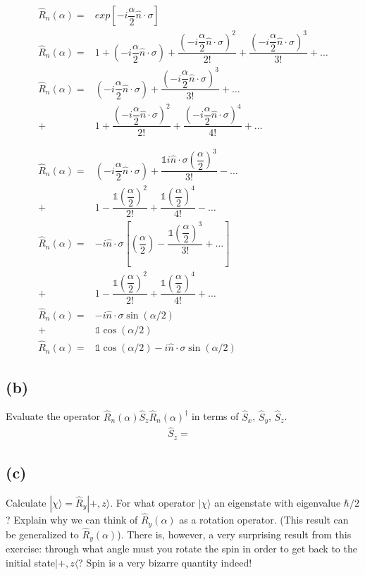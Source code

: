 \documentclass[12pt, a4paper]{article}
\begin{document}
\begin{align*}
\hat{R}_n (\alpha) =& exp\left[-i\dfrac{\alpha}{2}\hat{n}\cdot{\sigma}\right]
\\
\hat{R}_n (\alpha) =& 1 + 
\left(-i\dfrac{\alpha}{2}\hat{n}\cdot{\sigma}\right) + 
\dfrac{\left(-i\dfrac{\alpha}{2}\hat{n}\cdot{\sigma}\right)^2}{2!} +
\dfrac{\left(-i\dfrac{\alpha}{2}\hat{n}\cdot{\sigma}\right)^3}{3!} + \dots
\\
\hat{R}_n (\alpha)=& \left(-i\dfrac{\alpha}{2}\hat{n}\cdot{\sigma}\right) + 
\dfrac{\left(-i\dfrac{\alpha}{2}\hat{n}\cdot{\sigma}\right)^3}{3!} + \dots
\\
+& 1 + \dfrac{\left(-i\dfrac{\alpha}{2}\hat{n}\cdot{\sigma}\right)^2}{2!} +
\dfrac{\left(-i\dfrac{\alpha}{2}\hat{n}\cdot{\sigma}\right)^4}{4!} + \dots
\\
\\
\\
\hat{R}_n (\alpha)=& \left(-i\dfrac{\alpha}{2}\hat{n}\cdot{\sigma}\right) + \dfrac{\mathds{1}i\hat{n}\cdot{\sigma}\left(\dfrac{\alpha}{2}\right)^3}{3!} - \dots 
\\
+& 1 - \dfrac{\mathds{1}\left(\dfrac{\alpha}{2}\right)^2}{2!} + \dfrac{\mathds{1}\left(\dfrac{\alpha}{2}\right)^4}{4!} - \dots 
\\
\hat{R}_n (\alpha)=& -i\hat{n}\cdot{\sigma}\left[\left(\dfrac{\alpha}{2}\right) - \dfrac{\mathds{1}\left(\dfrac{\alpha}{2}\right)^3}{3!} + \dots \right]
\\
+& 1 - \dfrac{\mathds{1}\left(\dfrac{\alpha}{2}\right)^2}{2!} + \dfrac{\mathds{1}\left(\dfrac{\alpha}{2}\right)^4}{4!} + \dots 
\\
\hat{R}_n (\alpha)=& -i\hat{n}\cdot{\sigma}\sin(\alpha/2)
\\
+& \mathds{1}\cos(\alpha/2) 
\\
\hat{R}_n (\alpha)=& \boxed{ \mathds{1}\cos(\alpha/2) -i\hat{n}\cdot{\sigma}\sin(\alpha/2) }
\end{align*}

\subsection*{(b)}
Evaluate the operator $\hat{R}_n(\alpha)\hat{S}_z\hat{R}_n(\alpha)^\dagger$ in terms of $\hat{S}_x$, $\hat{S}_y$, $\hat{S}_z$.
\begin{align*}
\hat{S}_z =& 
\end{align*}

\subsection*{(c)}
Calculate $|\chi\rangle = \hat{R}_y |+,z\rangle$. For what operator $|\chi\rangle$ an eigenstate with eigenvalue $\hbar/2$? Explain why we can think of $\hat{R}_y(\alpha)$ as a rotation operator. (This result can be generalized to $\hat{R}_y(\alpha)$). There is, however, a very surprising result from this exercise: through what angle must you rotate the spin in order to get back to the initial state$|+,z\langle$? Spin is a very bizarre quantity indeed!
\end{document}
